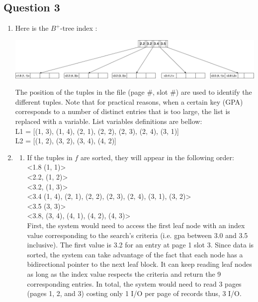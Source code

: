 \newpage
\subsection*{Question 3}

\begin{enumerate}[label={(\alph*)}]
    \item Here is the $B^+$-tree index :
    
        \begin{center}
            \includegraphics[width=1\textwidth]{img/img3.png}
        \end{center}
    
    \noindent The position of the tuples in the file (page \#, slot \#) are used to identify the different tuples. Note that for practical reasons, when a certain key (GPA) corresponds to a number of distinct entries that is too large, the list is replaced with a variable. List variables definitions are bellow: \\
    L1 = [(1, 3), (1, 4), (2, 1), (2, 2), (2, 3), (2, 4), (3, 1)]\\
    L2 = [(1, 2), (3, 2), (3, 4), (4, 2)]
    
    \item 
            \begin{enumerate}[label={\arabic*.}]
                \item If the tuples in $f$ are sorted, they will appear in the following order:\\
                    <1.8 (1, 1)> \\
                    <2.2, (1, 2)> \\
                    <3.2, (1, 3)> \\
                    <3.4 (1, 4), (2, 1), (2, 2), (2, 3), (2, 4), (3, 1), (3, 2)> \\
                    <3.5 (3, 3)> \\
                    <3.8, (3, 4), (4, 1), (4, 2), (4, 3)> \\
                    \noindent First, the system would need to access the first leaf node with an index value corresponding to the search's criteria (i.e. gpa between 3.0 and 3.5 inclusive). The first value is 3.2 for an entry at page 1 slot 3. Since data is sorted, the system can take advantage of the fact that each node has a bidirectional pointer to the next leaf block. It can keep reading leaf nodes as long as the index value respects the criteria and return the 9 corresponding entries. In total, the system would need to read 3 pages (pages 1, 2, and 3) costing only 1 I/O per page of records thus, 3 I/O. 
                    

\end{enumerate}
\end{enumerate}
